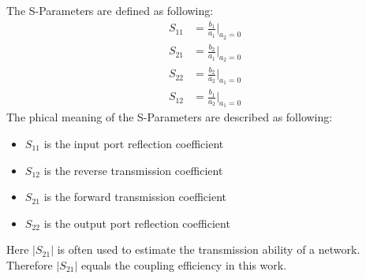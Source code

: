 The S-Parameters are defined as following:
\begin{align*}
S_{11}&=\frac{b_{1}}{a_{1}}|_{a_{2}=0}\\
S_{21}&=\frac{b_{2}}{a_{1}}|_{a_{2}=0}\\
S_{22}&=\frac{b_{2}}{a_{2}}|_{a_{1}=0}\\
S_{12}&=\frac{b_{1}}{a_{2}}|_{a_{1}=0}
\end{align*}
The phical meaning of the S-Parameters are described as following:
\begin{itemize}
\item $S_{11}$ is the input port reflection coefficient
\item $S_{12}$ is the reverse transmission coefficient
\item $S_{21}$ is the forward transmission coefficient
\item $S_{22}$ is the output port reflection coefficient
\end{itemize}
Here $|S_{21}|$ is often used to estimate the transmission ability of a network. Therefore $|S_{21}|$ equals the coupling efficiency in this work.
